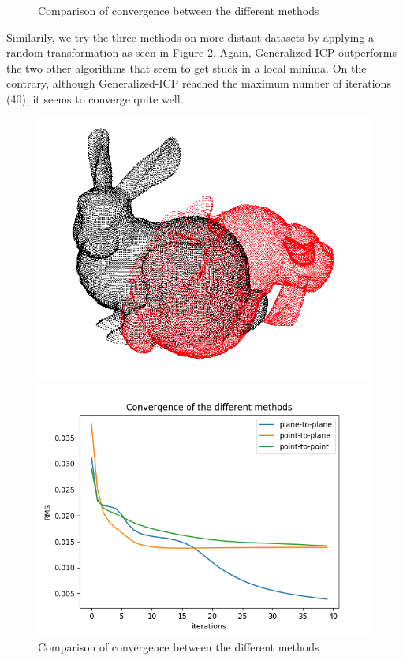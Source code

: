 \documentclass[11pt,letterpaper,leqno]{article}
\begin{document}
\begin{figure}[ht!]
\begin{minipage}{0.5\linewidth}
    \end{minipage}
    \caption{Comparison of convergence between the different methods}
    \label{fig:comp1}
\end{figure}

Similarily, we try the three methods on more distant datasets by applying a random transformation as seen in Figure \ref{fig:comp2}. Again, Generalized-ICP outperforms the two other algorithms that seem to get stuck in a local minima. On the contrary, although Generalized-ICP reached the maximum number of iterations (40), it seems to converge quite well.

\begin{figure}[ht!]
    \centering
    \begin{minipage}{0.5\linewidth}
    \includegraphics[width=\linewidth]{img/comparison_2_cloud.png}
    \end{minipage}\hfill
    \begin{minipage}{0.5\linewidth}
    \includegraphics[width=\linewidth]{img/comparison_2.png}
    \end{minipage}
    \caption{Comparison of convergence between the different methods}
    \label{fig:comp2}
\end{figure}
\end{document}
